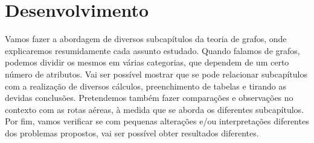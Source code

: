 

\chapter{Desenvolvimento}
\label{chapter:desenvolvimento}
Vamos fazer a abordagem de diversos subcapítulos da teoria de grafos, onde explicaremos resumidamente cada assunto estudado. Quando falamos de grafos, podemos dividir os mesmos em várias categorias, que dependem de um certo número de atributos.
Vai ser possível mostrar que se pode relacionar subcapítulos com a realização de diversos cálculos, preenchimento de tabelas e tirando as devidas conclusões.
Pretendemos também fazer comparações e observações no contexto com as rotas aéreas, à medida que se aborda os diferentes subcapítulos. Por fim, vamos verificar se com pequenas alterações e/ou interpretações diferentes dos problemas propostos, vai ser possível obter resultados diferentes.
